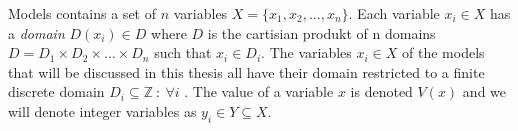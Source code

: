 Models contains a set of $n$ variables $X = \{ x_1, x_2, \dots , x_n \} $. Each 
variable $x_i \in X$ has a \emph{domain} $D(x_i) \in D$ where $D$ is the cartisian produkt of n domains $D = 
 D_1 \times D_2 \times \dots\times D_n $ such that $x_i \in D_i$. The variables $x_i \in X$ of the models that will be 
discussed in this thesis all have their domain restricted to a finite discrete domain $D_i \subseteq \mathbb{Z}\ : \: 
\forall i$ . The value of a variable $x$ is denoted $V(x)$ and 
we will denote integer variables as $y_i \in Y \subseteq X$. 